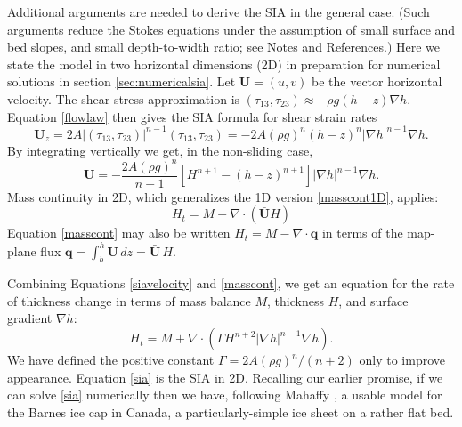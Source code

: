 \documentclass[letterpaper,final,12pt,reqno]{amsart}
\newcommand{\bq}{\mathbf{q}}
\newcommand{\grad}{\nabla}
\newcommand{\Div}{\nabla\cdot}
\begin{document}
Additional arguments are needed to derive the SIA in the general case.  (Such arguments reduce the Stokes equations under the assumption of small surface and bed slopes, and small depth-to-width ratio; see Notes and References.)  Here we state the model in two horizontal dimensions (2D) in preparation for numerical solutions in section \ref{sec:numericalsia}.  Let $\mathbf{U} = (u,v)$ be the vector horizontal velocity.  The shear stress approximation is $(\tau_{13},\tau_{23}) \approx - \rho g (h-z) \nabla h$.  Equation \eqref{flowlaw} then gives the SIA formula for shear strain rates
\begin{equation*}
\mathbf{U}_z = 2 A |(\tau_{13},\tau_{23})|^{n-1} (\tau_{13},\tau_{23}) = - 2 A (\rho g)^n (h-z)^n |\nabla h|^{n-1} \nabla h.
\end{equation*}
By integrating vertically we get, in the non-sliding case,
\begin{equation}
\mathbf{U} = - \frac{2 A (\rho g)^n}{n+1} \left[H^{n+1} - (h-z)^{n+1}\right] |\nabla h|^{n-1} \nabla h.  \label{siavelocity}
\end{equation}
Mass continuity in 2D, which generalizes the 1D version \eqref{masscont1D}, applies:
\begin{equation}
    H_t = M - \Div\left(\bar{\mathbf{U}} H\right)  \label{masscont}
\end{equation}
Equation \eqref{masscont} may also be written $H_t = M - \Div \bq$ in terms of the map-plane flux $\bq = \int_{b}^{h} \mathbf{U}\,dz = \bar{\mathbf{U}}\,H$.

Combining Equations \eqref{siavelocity} and \eqref{masscont}, we get an equation for the rate of thickness change in terms of mass balance $M$, thickness $H$, and surface gradient $\grad h$:
\begin{equation}
H_t = M + \Div \left(\Gamma H^{n+2} |\grad h|^{n-1} \grad h \right). \label{sia}
\end{equation}
We have defined the positive constant $\Gamma = 2 A (\rho g)^n / (n+2)$ only to improve appearance.  Equation \eqref{sia} is the SIA in 2D.  Recalling our earlier promise, if we can solve \eqref{sia} numerically then we have, following Mahaffy \cite{Mahaffy}, a usable model for the Barnes ice cap in Canada, a particularly-simple ice sheet on a rather flat bed.
\end{document}
